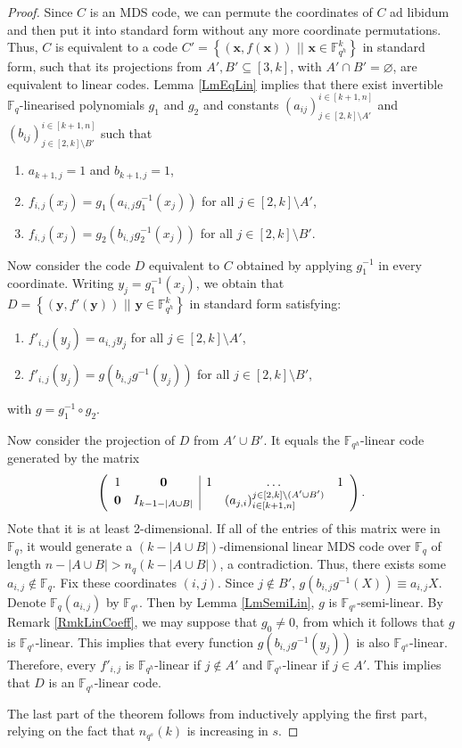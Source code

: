 \documentclass[a4paper]{article}
\theoremstyle{definition}
\newcommand{\FF}{\mathbb F}
\newcommand{\sett}[2]{ \left\{ #1 \, \, || \, \, #2 \right \} }
\newcommand{\xx}{\mathbf x}
\newcommand{\yy}{\mathbf y}
\begin{document}
\begin{proof}
Since $C$ is an MDS code, we can permute the coordinates of $C$ ad libidum and then put it into standard form without any more coordinate permutations.
Thus, $C$ is equivalent to a code 
\(C' = \sett{(\xx,f(\xx))}{\xx \in \FF_{q^h}^k}\)
in standard form, such that its projections from $A', B' \subseteq [3,k]$, with $A' \cap B' = \varnothing$, are equivalent to linear codes. 
Lemma \ref{LmEqLin} implies that there exist invertible $\FF_q$-linearised polynomials $g_1$ and $g_2$ and constants $(a_{ij})^{i \in [k+1,n]}_{j \in [2,k] \setminus A'}$ and $(b_{ij})^{i \in [k+1,n]}_{j \in [2,k] \setminus B'}$ such that
\begin{enumerate}
 \item $a_{k+1,j} = 1$ and $b_{k+1,j} = 1$,
 \item $f_{i,j}(x_j) = g_1(a_{i,j} g_1^{-1}(x_j))$ for all $j \in [2,k] \setminus A'$,
 \item $f_{i,j}(x_j) = g_2(b_{i,j} g_2^{-1}(x_j))$ for all $j \in [2,k] \setminus B'$.
\end{enumerate}
Now consider the code $D$ equivalent to $C$ obtained by applying $g_1^{-1}$ in every coordinate.
Writing $y_j = g_1^{-1}(x_j)$, we obtain that \( D = \sett{(\yy,f'(\yy))}{\yy\in\FF_{q^h}^k} \) in standard form satisfying:
\begin{enumerate}
 \item \( f'_{i,j}(y_j) = a_{i,j} y_j \) for all \( j \in [2,k] \setminus A' \),
 \item \( f'_{i,j}(y_j) = g(b_{i,j} g^{-1}(y_j)) \) for all \( j \in [2,k] \setminus B' \),
\end{enumerate}
with \( g = g_1^{-1} \circ g_2 \).

Now consider the projection of $D$ from $A' \cup B'$.
It equals the $\FF_{q^h}$-linear code generated by the matrix
\[
 \left( \begin{array}{c c | c c c}
  1 & \mathbf 0 & 1 & \dots & 1 \\
  \mathbf 0 & I_{k-1-|A\cup B|} & & (a_{j,i})^{j\in[2,k]\setminus (A'\cup B')}_{i\in[k+1,n]}
 \end{array} \right).
\]
Note that it is at least 2-dimensional.
If all of the entries of this matrix were in $\FF_q$, it would generate a $(k-|A\cup B|)$-dimensional linear MDS code over $\FF_q$ of length \( n - |A \cup B| > n_q(k-|A \cup B|) \), a contradiction.
Thus, there exists some $a_{i,j} \notin \FF_q$.
Fix these coordinates $(i,j)$.
Since $j \notin B'$,
\(
 g(b_{i,j} g^{-1}(X)) \equiv a_{i,j} X.
\)
Denote \(\FF_q(a_{i,j}) \) by \(\FF_{q^s}\).
Then by Lemma \ref{LmSemiLin}, $g$ is $\FF_{q^s}$-semi-linear.
By Remark \ref{RmkLinCoeff}, we may suppose that $g_0 \neq 0$, from which it follows that $g$ is $\FF_{q^s}$-linear.
This implies that every function \( g(b_{i,j} g^{-1}(y_j)) \) is also $\FF_{q^s}$-linear.
Therefore, every $f'_{i,j}$ is $\FF_{q^h}$-linear if $j \notin A'$ and $\FF_{q^s}$-linear if $j \in A'$.
This implies that $D$ is an $\FF_{q^s}$-linear code.

The last part of the theorem follows from inductively applying the first part, relying on the fact that $n_{q^s}(k)$ is increasing in $s$.
\end{proof}
\end{document}

